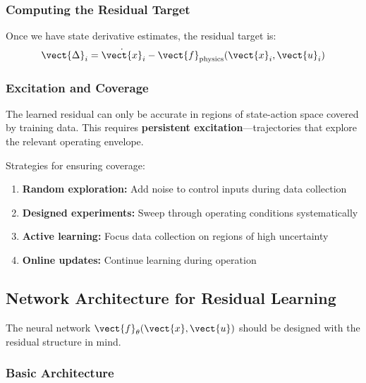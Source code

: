 \subsubsection{Computing the Residual Target}

Once we have state derivative estimates, the residual target is:
\begin{equation}
\vect{\Delta}_i = \dot{\vect{x}}_i - \vect{f}_{\text{physics}}(\vect{x}_i, \vect{u}_i)
\label{eq:residual_target}
\end{equation}


\subsubsection{Excitation and Coverage}

The learned residual can only be accurate in regions of state-action space covered by training data. This requires \textbf{persistent excitation}---trajectories that explore the relevant operating envelope.

Strategies for ensuring coverage:
\begin{enumerate}
    \item \textbf{Random exploration:} Add noise to control inputs during data collection
    \item \textbf{Designed experiments:} Sweep through operating conditions systematically
    \item \textbf{Active learning:} Focus data collection on regions of high uncertainty
    \item \textbf{Online updates:} Continue learning during operation
\end{enumerate}

\subsection{Network Architecture for Residual Learning}

The neural network $\vect{f}_\theta(\vect{x}, \vect{u})$ should be designed with the residual structure in mind.

\subsubsection{Basic Architecture}

